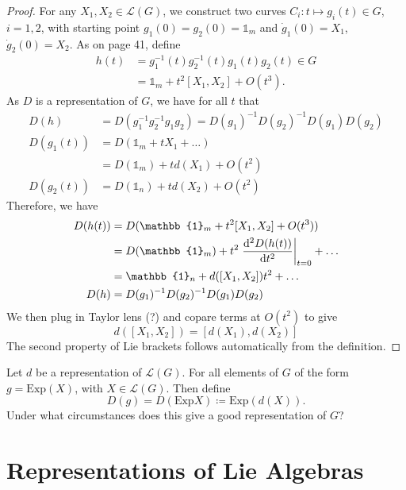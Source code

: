 \begin{proof}
  For any $X_1, X_2 \in \mathscr{L}(G)$, we construct two curves $C_i \colon t \mapsto g_i(t) \in G$, $i = 1, 2$, with starting point $g_1(0) = g_2(0) = \mathbb{1}_m$ and $\dot g_1(0) = X_1$, $\dot g_2(0) = X_2$.
  As on page 41, define
  \begin{align}
    h(t) &= g_1^{-1}(t)g_2^{-1}(t)g_1(t)g_2(t) \in G \\
	 &= \mathbb{1}_m + t^2 [X_1, X_2] + O(t^3).
  \end{align}
  As $D$ is a representation of $G$, we have for all $t$ that
  \begin{align}
    D(h) &= D(g_1^{-1} g_2^{-1} g_1 g_2) = D(g_1)^{-1} D(g_2)^{-1} D(g_1) D(g_2) \\
    D(g_1(t)) &= D(\mathbb{1}_m + t X_1 + \dots) \\
	      &= D(\mathbb{1}_m) + td(X_1) + O(t^2) \\
    D(g_2(t)) &= D(\mathbb{1}_n) + td(X_2) + O(t^2)
  \end{align}
  Therefore, we have
  \begin{align}
    D(h(t)) &= D(\mathbb{1}_m + t^2 [X_1, X_2] + O(t^3)) \\
	    &= D(\mathbb{1}_m) + t^2 \left.\dv[2]{D(h(t))}{t}\right\rvert_{t = 0} + \dots \\
	    &= \mathbb{1}_n + d([X_1, X_2]) t^2 + \dots \\
    D(h) &= D(g_1)^{-1} D(g_2)^{-1} D(g_1) D(g_2)
  \end{align}
  We then plug in Taylor lens (?) and copare terms at $O(t^2)$ to give
  \begin{equation}
    d([X_1, X_2]) = [d(X_1), d(X_2)]
  \end{equation}
  The second property of Lie brackets follows automatically from the definition.
\end{proof}
\begin{exercise}
  Let $d$ be a representation of $\mathscr{L}(G)$. For all elements of $G$ of the form $g = \text{Exp}(X)$, with $X \in \mathscr{L}(G)$. Then define
  \begin{equation}
    D(g) = D(\text{Exp} X) \coloneqq \text{Exp} (d(X)).
  \end{equation}
  Under what circumstances does this give a good representation of $G$?
\end{exercise}

\chapter{Representations of Lie Algebras}%
\label{cha:representations_of_lie_algebras}

